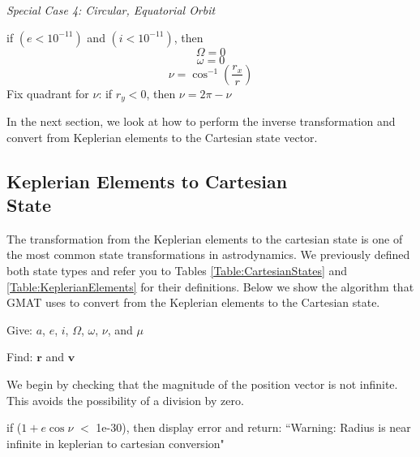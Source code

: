 \noindent\textit{Special Case 4:  Circular, Equatorial Orbit  }

\noindent if $(e < 10^{-11})$  and $(i < 10^{-11})$, then
%
\begin{equation}
     \Omega = 0
\end{equation}
%
\begin{equation}
     \omega = 0
\end{equation}
%
\begin{equation}
    \nu = \cos^{-1}\left( \frac{r_x}{r}\right)
\end{equation}
%
Fix quadrant for $\nu$:  if $r_y < 0$, then $\nu = 2\pi - \nu$
%

In the next section, we look at how to perform the inverse
transformation and convert from Keplerian elements to the
Cartesian state vector.

\subsection{Keplerian Elements to Cartesian \\ State}


\label{Sec:Kep2Cart}  

The transformation from the Keplerian elements to the cartesian
state is one of the most common state transformations in
astrodynamics.  We previously defined both state types and refer you
to Tables \ref{Table:CartesianStates} and
\ref{Table:KeplerianElements} for their definitions.  Below we show
the algorithm that GMAT uses to convert from the Keplerian elements
to the Cartesian state\cite{Vallado:01}.

\noindent Give:  $a$, $e$, $i$, $\Omega$, $\omega$, $\nu$, and
$\mu$

\noindent Find:  $\mathbf{r}$  and $\mathbf{v}$

We begin by checking that the magnitude of the position vector is
not infinite.  This avoids the possibility of a division by zero.

\noindent if ($1+e\cos{\nu}$ $<$ 1e-30), then display error and
return: ``Warning: Radius is near infinite in keplerian to
cartesian conversion"

